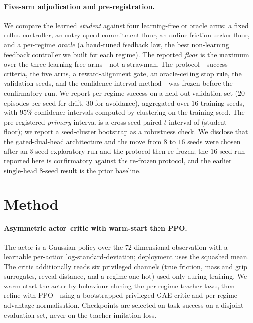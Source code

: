 \documentclass[11pt]{article}
\begin{document}
\paragraph{Five-arm adjudication and pre-registration.}
We compare the learned \emph{student} against four learning-free or oracle arms: a fixed reflex
controller, an entry-speed-commitment floor, an online friction-seeker floor, and a per-regime
\emph{oracle} (a hand-tuned feedback law, the best non-learning feedback controller we built for
each regime). The reported \emph{floor} is the maximum over the three learning-free arms---not a
strawman. The protocol---success criteria, the five arms, a reward-alignment gate, an
oracle-ceiling stop rule, the validation seeds, and the confidence-interval method---was frozen
before the confirmatory run. We report per-regime success on a held-out validation set ($20$
episodes per seed for drift, $30$ for avoidance), aggregated over $16$ training seeds, with $95\%$
confidence intervals computed by clustering on the training seed. The pre-registered \emph{primary}
interval is a cross-seed paired-$t$ interval of (student $-$ floor); we report a seed-cluster
bootstrap as a robustness check. We disclose that the gated-dual-head architecture and the move from
$8$ to $16$ seeds were chosen after an $8$-seed exploratory run and the protocol then re-frozen; the
$16$-seed run reported here is confirmatory against the re-frozen protocol, and the earlier
single-head $8$-seed result is the prior baseline.

\section{Method}
\paragraph{Asymmetric actor--critic with warm-start then PPO.}
The actor is a Gaussian policy over the $72$-dimensional observation with a learnable per-action
log-standard-deviation; deployment uses the squashed mean. The critic additionally reads six
privileged channels (true friction, mass and grip surrogates, reveal distance, and a regime
one-hot) used only during training. We warm-start the actor by behaviour cloning the per-regime
teacher laws, then refine with PPO~\citep{schulman2017proximal} using a bootstrapped privileged
GAE critic and per-regime advantage normalisation. Checkpoints are selected on task success on a
disjoint evaluation set, never on the teacher-imitation loss.
\end{document}
